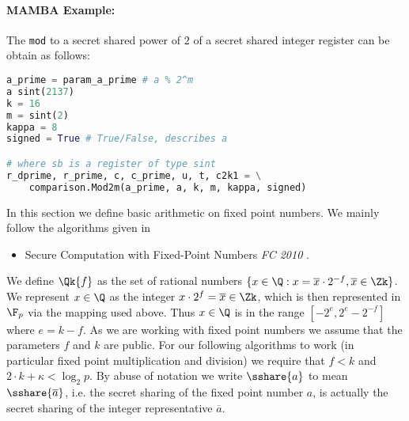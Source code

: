   \paragraph{MAMBA Example:} The \verb|mod| to a secret shared power of $2$ of a secret shared integer register can be obtain as follows:
  \begin{lstlisting}[language={python}]
a_prime = param_a_prime # a % 2^m
a sint(2137)
k = 16
m = sint(2)
kappa = 8
signed = True # True/False, describes a

# where sb is a register of type sint
r_dprime, r_prime, c, c_prime, u, t, c2k1 = \
    comparison.Mod2m(a_prime, a, k, m, kappa, signed)
\end{lstlisting}


  In this section we define basic arithmetic on fixed
  point numbers.
  We mainly follow the algorithms given in
  \begin{itemize}
    \item Secure Computation with Fixed-Point Numbers {\em FC 2010} \cite{CS10}.
  \end{itemize}
  We define $\Qk{f}$ as the set of rational numbers
$\{x \in \Q: x = \overline{x} \cdot 2^{-f}, \overline{x} \in \Zk\}$.
  We represent $x \in \Q$ as the integer $x \cdot 2^f = \overline{x} \in \Zk$,
  which is then represented in $\F_p$ via the mapping used above.
  Thus $x \in \Q$ is in the range $[-2^e,2^e-2^{-f}]$
  where $e=k-f$.
  As we are working with fixed point numbers we assume that the
  parameters $f$ and $k$ are public.
  For our following algorithms to work (in particular fixed point
  multiplication and division) we require that
$f<k$ and $2 \cdot k + \kappa < \log_2 p$.
  By abuse of notation we write $\sshare{a}$ to mean $\sshare{\overline{a}}$,
  i.e. the secret sharing of the fixed point number $a$,
  is actually the secret sharing of the integer representative
$\overline{a}$.

  \iffalse
    \msubsubsection{$\mathsf{Scale}(\sshare{a},k,f_1,f_2)$:}
    Sometimes we want to scale the input fixed point number $a$
    from $\Qk{f_1}$ to $\Qk{f_2}$.
    \begin{enumerate}
      \item $m \asn f_2-f_1$.
      \item If $m\ge 0$ then $\sshare{a'} \asn 2^m \cdot \sshare{a}$.
      \item Else $\sshare{a'} \asn \mathsf{TruncPr}(\sshare{a},k,-m)$.
      \item Return $\sshare{a'}$.
    \end{enumerate}
    This is not directly callable from MAMBA it is here purely
    for documentation reasons.
  \fi


